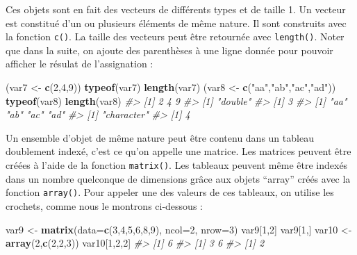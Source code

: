 \documentclass[]{article}
\newenvironment{Shaded}{\begin{snugshade}}{\end{snugshade}}
\newcommand{\CommentTok}[1]{\textcolor[rgb]{0.56,0.35,0.01}{\textit{#1}}}
\newcommand{\DataTypeTok}[1]{\textcolor[rgb]{0.13,0.29,0.53}{#1}}
\newcommand{\DecValTok}[1]{\textcolor[rgb]{0.00,0.00,0.81}{#1}}
\newcommand{\KeywordTok}[1]{\textcolor[rgb]{0.13,0.29,0.53}{\textbf{#1}}}
\newcommand{\NormalTok}[1]{#1}
\newcommand{\StringTok}[1]{\textcolor[rgb]{0.31,0.60,0.02}{#1}}
\begin{document}
Ces objets sont en fait des vecteurs de différents types et de taille 1. Un vecteur est constitué d'un ou plusieurs éléments de même nature. Il sont construits avec la fonction \texttt{c()}. La taille des vecteurs peut être retournée avec \texttt{length()}. Noter que dans la suite, on ajoute des parenthèses à une ligne donnée pour pouvoir afficher le résulat de l'assignation :

\begin{Shaded}
\begin{Highlighting}[]
\NormalTok{(var7 <-}\StringTok{ }\KeywordTok{c}\NormalTok{(}\DecValTok{2}\NormalTok{,}\DecValTok{4}\NormalTok{,}\DecValTok{9}\NormalTok{))}
\KeywordTok{typeof}\NormalTok{(var7)}
\KeywordTok{length}\NormalTok{(var7)}
\NormalTok{(var8 <-}\StringTok{ }\KeywordTok{c}\NormalTok{(}\StringTok{"aa"}\NormalTok{,}\StringTok{"ab"}\NormalTok{,}\StringTok{"ac"}\NormalTok{,}\StringTok{"ad"}\NormalTok{))}
\KeywordTok{typeof}\NormalTok{(var8)}
\KeywordTok{length}\NormalTok{(var8)}
\CommentTok{#> [1] 2 4 9}
\CommentTok{#> [1] "double"}
\CommentTok{#> [1] 3}
\CommentTok{#> [1] "aa" "ab" "ac" "ad"}
\CommentTok{#> [1] "character"}
\CommentTok{#> [1] 4}
\end{Highlighting}
\end{Shaded}

Un ensemble d'objet de même nature peut être contenu dans un tableau doublement indexé, c'est ce qu'on appelle une matrice. Les matrices peuvent être créées à l'aide de la fonction \texttt{matrix()}. Les tableaux peuvent même être indexés dans un nombre quelconque de dimensions grâce aux objets ``array'' créés avec la fonction \texttt{array()}. Pour appeler une des valeurs de ces tableaux, on utilise les crochets, comme nous le montrons ci-dessous :

\begin{Shaded}
\begin{Highlighting}[]
\NormalTok{var9 <-}\StringTok{ }\KeywordTok{matrix}\NormalTok{(}\DataTypeTok{data=}\KeywordTok{c}\NormalTok{(}\DecValTok{3}\NormalTok{,}\DecValTok{4}\NormalTok{,}\DecValTok{5}\NormalTok{,}\DecValTok{6}\NormalTok{,}\DecValTok{8}\NormalTok{,}\DecValTok{9}\NormalTok{), }\DataTypeTok{ncol=}\DecValTok{2}\NormalTok{, }\DataTypeTok{nrow=}\DecValTok{3}\NormalTok{)}
\NormalTok{var9[}\DecValTok{1}\NormalTok{,}\DecValTok{2}\NormalTok{]}
\NormalTok{var9[}\DecValTok{1}\NormalTok{,]}
\NormalTok{var10 <-}\StringTok{ }\KeywordTok{array}\NormalTok{(}\DecValTok{2}\NormalTok{,}\KeywordTok{c}\NormalTok{(}\DecValTok{2}\NormalTok{,}\DecValTok{2}\NormalTok{,}\DecValTok{3}\NormalTok{))}
\NormalTok{var10[}\DecValTok{1}\NormalTok{,}\DecValTok{2}\NormalTok{,}\DecValTok{2}\NormalTok{]}
\CommentTok{#> [1] 6}
\CommentTok{#> [1] 3 6}
\CommentTok{#> [1] 2}
\end{Highlighting}
\end{Shaded}
\end{document}

